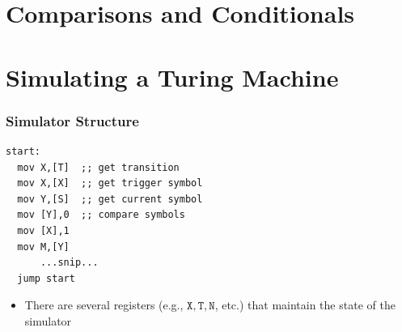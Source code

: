 \documentclass{beamer}
\begin{document}
\section{Comparisons and Conditionals}

%

\section{Simulating a Turing Machine}

%

%
\begin{frame}[fragile]
\frametitle{Simulator Structure}

\begin{center}
\begin{verbatim}
start:
  mov X,[T]  ;; get transition
  mov X,[X]  ;; get trigger symbol
  mov Y,[S]  ;; get current symbol
  mov [Y],0  ;; compare symbols
  mov [X],1
  mov M,[Y]
      ...snip...
  jump start
\end{verbatim}
\end{center}
\begin{itemize}
\item There are several registers (e.g., $\mathtt{X, T, N}$, etc.) that maintain the state of the simulator
\end{itemize}
\end{frame}
\end{document}

